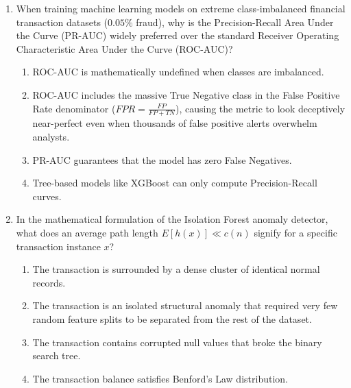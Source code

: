 \begin{enumerate}[label=\textbf{MCQ 9.\arabic*}]
    \item When training machine learning models on extreme class-imbalanced financial transaction datasets ($0.05\%$ fraud), why is the Precision-Recall Area Under the Curve (PR-AUC) widely preferred over the standard Receiver Operating Characteristic Area Under the Curve (ROC-AUC)?
    \begin{enumerate}[label=(\alph*)]
        \item ROC-AUC is mathematically undefined when classes are imbalanced.
        \item ROC-AUC includes the massive True Negative class in the False Positive Rate denominator ($FPR = \frac{FP}{FP + TN}$), causing the metric to look deceptively near-perfect even when thousands of false positive alerts overwhelm analysts.
        \item PR-AUC guarantees that the model has zero False Negatives.
        \item Tree-based models like XGBoost can only compute Precision-Recall curves.
    \end{enumerate}

    \item In the mathematical formulation of the Isolation Forest anomaly detector, what does an average path length $E[h(x)] \ll c(n)$ signify for a specific transaction instance $x$?
    \begin{enumerate}[label=(\alph*)]
        \item The transaction is surrounded by a dense cluster of identical normal records.
        \item The transaction is an isolated structural anomaly that required very few random feature splits to be separated from the rest of the dataset.
        \item The transaction contains corrupted null values that broke the binary search tree.
        \item The transaction balance satisfies Benford's Law distribution.
    \end{enumerate}
\end{enumerate}
